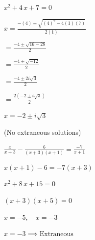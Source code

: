 \documentclass[addpoints]{exam}
\begin{document}
\begin{questions}
\newpage

\question[7]\label{exact-start} 
\(\displaystyle{ x^{2} + 4 \, x + 7 = 0 }\) \\
\begin{solution}
\(x = \frac{-(4) \pm \sqrt{(4)^2 - 4(1)(7)}}{2(1)}\) 

 \(= \frac{-4 \pm \sqrt{16 - 28}}{2}\) 

 \(= \frac{-4 \pm \sqrt{-12}}{2}\) 

 \(= \frac{-4 \pm 2i\sqrt{3}}{2}\) 

 \(= \frac{2(-2 \pm i\sqrt{3})}{2}\) 

 \(\boxed{x = -2 \pm i\sqrt{3}}\) 

 (No extraneous solutions)
\end{solution}

\question[7]
\(\displaystyle{ \displaystyle \frac{x}{x + 3} - \frac{6}{(x + 3)(x + 1)} = \frac{-7}{x + 1} }\)\\
\begin{solution}
\(x(x + 1) - 6 = -7(x + 3)\) 

 \(x^{2} + 8 \, x + 15 = 0\) 

 \((x + 3)(x + 5) = 0\) 

 \(x = -5, \quad x = -3\) 

 \(x = -3 \implies \text{Extraneous}\) 


\end{solution}
\end{questions}
\end{document}
